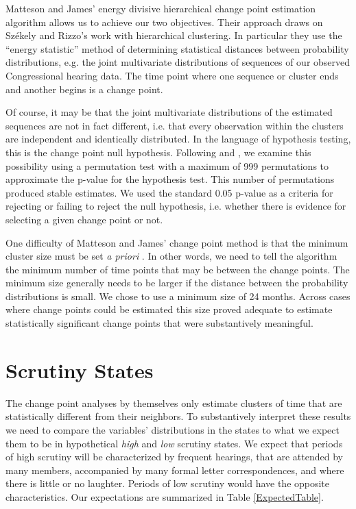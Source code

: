 \documentclass[a4paper]{article}\usepackage[]{graphicx}\usepackage[]{color}
\begin{document}
Matteson and James' \citeyearpar{Matteson2014} energy divisive hierarchical change point estimation algorithm allows us to achieve our two objectives. Their approach draws on Sz{\'e}kely and Rizzo's \citeyearpar{Szekely2005} work with hierarchical clustering. In particular they use the ``energy statistic'' method of determining statistical distances between probability distributions, e.g. the joint multivariate distributions of sequences of our observed Congressional hearing data. The time point where one sequence or cluster ends and another begins is a change point.

Of course, it may be that the joint multivariate distributions of the estimated sequences are not in fact different, i.e. that every observation within the clusters are independent and identically distributed. In the language of hypothesis testing, this is the change point null hypothesis. Following \cite{Matteson2014} and \cite{Rizzo2010}, we examine this possibility using a permutation test with a maximum of 999 permutations to approximate the p-value for the hypothesis test. This number of permutations produced stable estimates. We used the standard 0.05 p-value as a criteria for rejecting or failing to reject the null hypothesis, i.e. whether there is evidence for selecting a given change point or not.

One difficulty of Matteson and James' change point method is that the minimum cluster size must be set \emph{a priori} \citeyearpar[337]{Matteson2014}. In other words, we need to tell the algorithm the minimum number of time points that may be between the change points. The minimum size generally needs to be larger if the distance between the probability distributions is small. We chose to use a minimum size of 24 months. Across cases where change points could be estimated this size proved adequate to estimate statistically significant change points that were substantively meaningful.

\section{Scrutiny States}

The change point analyses by themselves only estimate clusters of time that are statistically different from their neighbors. To substantively interpret these results we need to compare the variables' distributions in the states to what we expect them to be in hypothetical \emph{high} and \emph{low} scrutiny states. We expect that periods of high scrutiny will be characterized by frequent hearings, that are attended by many members, accompanied by many formal letter correspondences, and where there is little or no laughter. Periods of low scrutiny would have the opposite characteristics. Our expectations are summarized in Table \ref{ExpectedTable}.
\end{document}
